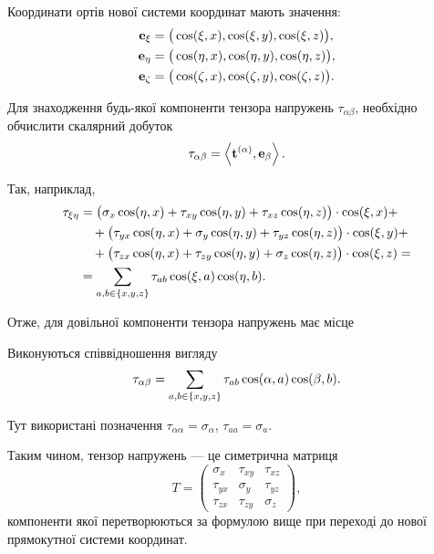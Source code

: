 Координати ортів нової системи координат мають значення:
\begin{align}
	\bf{e}_\xi &= \big( \cos (\xi, x), \cos (\xi, y), \cos (\xi, z) \big), \\
	\bf{e}_\eta &= \big( \cos (\eta, x), \cos (\eta, y), \cos (\eta, z) \big), \\
	\bf{e}_\zeta &= \big( \cos (\zeta, x), \cos (\zeta, y), \cos (\zeta, z) \big).
\end{align}
 
Для знаходження будь-якої компоненти тензора напружень $\tau_{\alpha\beta}$, необхідно обчислити скалярний добуток
\begin{equation}
	\tau_{\alpha \beta} = \langle \bf{t}^{(\alpha)}, \bf{e}_\beta \rangle.
\end{equation}

Так, наприклад,
\begin{equation}
	\begin{aligned}
		\tau_{\xi \eta} &= \big( \sigma_x \cos (\eta, x) + \tau_{x y} \cos (\eta, y) + \tau_{x z} \cos (\eta, z) \big) \cdot \cos (\xi, x) + \\
		&\quad + \big( \tau_{y x} \cos (\eta, x) + \sigma_y \cos (\eta, y) + \tau_{y z} \cos (\eta, z) \big) \cdot \cos (\xi, y) + \\
		&\quad + \big( \tau_{z x} \cos (\eta, x) + \tau_{z y} \cos (\eta, y) + \sigma_z \cos (\eta, z) \big) \cdot \cos (\xi, z) = \\
		&= \Sum_{a, b \in \{x, y, z\}} \tau_{a b} \cos (\xi, a) \cos (\eta, b).
	\end{aligned}
\end{equation}

Отже, для довільної компоненти тензора напружень має місце 
\begin{th_formula*}
	Виконуються співвідношення вигляду
	\begin{equation}
		\tau_{\alpha \beta} = \Sum_{a, b \in \{x, y, z\}} \tau_{a b} \cos (\alpha, a) \cos (\beta, b).
	\end{equation}
\end{th_formula*}

\begin{remark}
	Тут використані позначення $\tau_{\alpha \alpha} = \sigma_\alpha$, $\tau_{a a} = \sigma_a$.
\end{remark}

Таким чином, тензор напружень --- це симетрична матриця
\begin{equation}
	T = 
	\begin{pmatrix}
		\sigma_x & \tau_{xy} & \tau_{xz} \\
		\tau_{yx} & \sigma_y & \tau_{yz} \\
		\tau_{zx} & \tau_{zy} & \sigma_z
	\end{pmatrix},
\end{equation}
компоненти якої перетворюються за формулою вище при переході до нової прямокутної системи координат. \medskip

